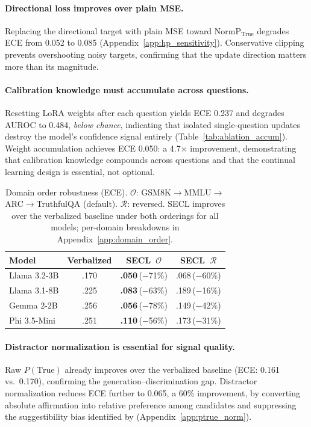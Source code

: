 \documentclass[11pt]{article}
\begin{document}
\paragraph{Directional loss improves over plain MSE.}
Replacing the directional target with plain MSE toward $\text{NormP}_{\text{True}}$ degrades ECE from 0.052 to 0.085 (Appendix~\ref{app:hp_sensitivity}). Conservative clipping prevents overshooting noisy targets, confirming that the update direction matters more than its magnitude.

\paragraph{Calibration knowledge must accumulate across questions.}
Resetting LoRA weights after each question yields ECE 0.237 and degrades AUROC to 0.484, \emph{below chance}, indicating that isolated single-question updates destroy the model's confidence signal entirely (Table~\ref{tab:ablation_accum}). Weight accumulation achieves ECE 0.050: a 4.7$\times$ improvement, demonstrating that calibration knowledge compounds across questions and that the continual learning design is essential, not optional.

\begin{table}[!t]
\centering
\small
\renewcommand{\arraystretch}{1.35}
\begin{tabular}{@{}lccc@{}}
\toprule
\textbf{Model}
  & \textbf{Verbalized} & \textbf{SECL}~$\mathcal{O}$
  & \textbf{SECL}~$\mathcal{R}$ \\
\midrule
Llama 3.2-3B  & .170 & \textbf{.050}\,{\scriptsize($-$71\%)} & .068\,{\scriptsize($-$60\%)} \\
Llama 3.1-8B  & .225 & \textbf{.083}\,{\scriptsize($-$63\%)} & .189\,{\scriptsize($-$16\%)} \\
Gemma 2-2B    & .256 & \textbf{.056}\,{\scriptsize($-$78\%)} & .149\,{\scriptsize($-$42\%)} \\
Phi 3.5-Mini  & .251 & \textbf{.110}\,{\scriptsize($-$56\%)} & .173\,{\scriptsize($-$31\%)} \\
\bottomrule
\end{tabular}
\caption{Domain order robustness (ECE).
$\mathcal{O}$: GSM8K$\to$MMLU$\to$ARC$\to$TruthfulQA (default).
$\mathcal{R}$: reversed.
SECL improves over the verbalized baseline under both orderings
for all models; per-domain breakdowns in Appendix~\ref{app:domain_order}.}
\label{tab:domain_order}
\end{table}


\paragraph{Distractor normalization is essential for signal quality.}
Raw $P(\text{True})$ already improves over the verbalized baseline (ECE: 0.161 vs.\ 0.170), confirming the generation--discrimination gap. Distractor normalization reduces ECE further to 0.065, a 60\% improvement, by converting absolute affirmation into relative preference among candidates and suppressing the suggestibility bias identified by \citet{wang_calibrating_2025} (Appendix~\ref{app:ptrue_norm}).
\end{document}
